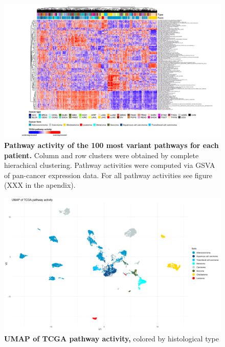 \documentclass[
  11pt,
  parskip,
  oneside]{scrreprt}
\begin{document}
\begin{figure}

{\centering \includegraphics[width=1\linewidth]{figures/Pan Cancer GSVA Heatmap neu und fertig top 100 Pathways} 

}

\caption{\textbf{Pathway activity of the 100 most variant pathways for each patient.} Column and row clusters were obtained by complete hierachical clustering. Pathway activities were computed via GSVA of pan-cancer expression data. For all pathway activities see figure (XXX in the apendix).}\label{fig:exp}
\end{figure}

\begin{figure}

{\centering \includegraphics[width=0.8\linewidth]{figures/Pan Cancer UMAP cancer form} 

}

\caption{\textbf{UMAP of TCGA pathway activity,} colored by histological type}\label{fig:UMAPPanForm}
\end{figure}
\end{document}
